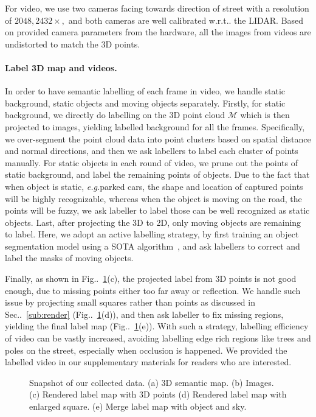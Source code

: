 \documentclass[10pt,twocolumn,letterpaper]{article}
\makeatletter
\newcommand{\figref}[1]{Fig\onedot~\ref{#1}}
\newcommand{\secref}[1]{Sec\onedot~\ref{#1}}
\newcommand{\hua}[1]{{\mathcal #1}}
\newcommand{\by}[2]{\ensuremath{#1 \! \times \! #2}}
\DeclareRobustCommand\onedot{\futurelet\@let@token\@onedot}
\def\onedot{\ifx\@let@token.\else.\null\fi\xspace}
\def\eg{\emph{e.g.}}
\def\wrt{w.r.t\onedot}
\makeatother
\begin{document}
For video, we use two cameras facing towards direction of street with a resolution of \by{2048, 2432}, and both cameras are well calibrated \wrt the LIDAR. Based on provided camera parameters from the hardware, all the images from videos are undistorted to match the 3D points.

\paragraph{Label 3D map and videos.}
In order to have semantic labelling of each frame in video, we handle static background, static objects and moving objects separately. 
Firstly, for static background, we directly do labelling on the 3D point cloud $\hua{M}$ which is then projected to images, yielding labelled background for all the frames.
Specifically, we over-segment the point cloud data into point clusters based on spatial distance and normal directions, and then we ask labellers to label each cluster of points manually. 
For static objects in each round of video, we prune out the points of static background, and label the remaining points of objects. Due to the fact that when object is static, \eg parked cars, the shape and location of captured points will be highly recognizable, whereas when the object is moving on the road, the points will be fuzzy, we ask labeller to label those can be well recognized as static objects. Last, after projecting the 3D to 2D, only moving objects are remaining to label. Here, we adopt an active labelling strategy, by first training an object segmentation model using a SOTA algorithm~\cite{WuSH16e}, and ask labellers to correct and label the masks of moving objects.

Finally, as shown in \figref{fig:data}(c), the projected label from 3D points is not good enough, due to missing points either too far away or reflection. We handle such issue by projecting small squares rather than points as discussed in \secref{sub:render} (\figref{fig:data}(d)), and then ask labeller to fix missing regions, yielding the final label map (\figref{fig:data}(e)).
With such a strategy, labelling efficiency of video can be vastly increased, avoiding labelling edge rich regions like trees and poles on the street, especially when occlusion is happened.
We provided the labelled video in our supplementary materials for readers who are interested. 

\begin{figure}[t]
\begin{center}
\fbox{\rule{0pt}{2in} \rule{0.9\linewidth}{0pt}}
\end{center}
   \caption{Snapshot of our collected data. (a) 3D semantic map. (b) Images. (c) Rendered label map with 3D points (d) Rendered label map with enlarged square. (e) Merge label map with object and sky.}
\label{fig:data}
\end{figure}
\end{document}
